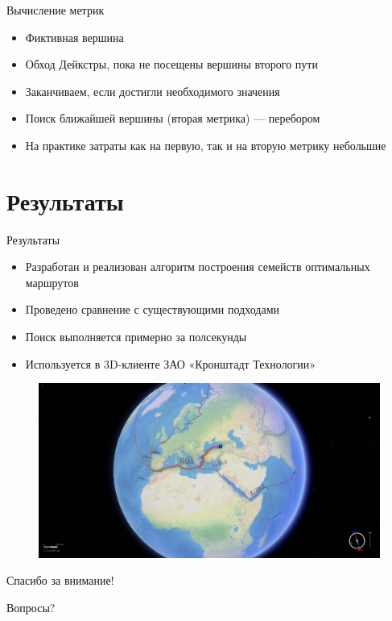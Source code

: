 \documentclass[russian, hyperref={unicode}]{beamer}
\theoremstyle{definition}
\begin{document}
\begin{frame}{Вычисление метрик}
    \begin{itemize}
        \item Фиктивная вершина
        \item Обход Дейкстры, пока не посещены вершины второго пути 
        \item Заканчиваем, если достигли необходимого значения
        \item Поиск ближайшей вершины (вторая метрика) — перебором
        \item На практике затраты как на первую, так и на вторую
          метрику небольшие
    \end{itemize}
\end{frame}

\section{Результаты}

\begin{frame}{Результаты}
     {
        \begin{itemize}
            \item Разработан и реализован алгоритм построения семейств оптимальных маршрутов 
            \item Проведено сравнение с существующими подходами 
            \item Поиск выполняется примерно за полсекунды 
            \item Используется в 3D-клиенте ЗАО «Кронштадт Технологии»
        \end{itemize}
    }
     {
        \begin{figure}
            \includegraphics[width=\textwidth]{results}
        \end{figure}
    }
\end{frame}

\begin{frame}{Спасибо за внимание!}
    \begin{center}
        \Huge
        {\color{blue} Вопросы?}
    \end{center}
\end{frame}
\end{document}
